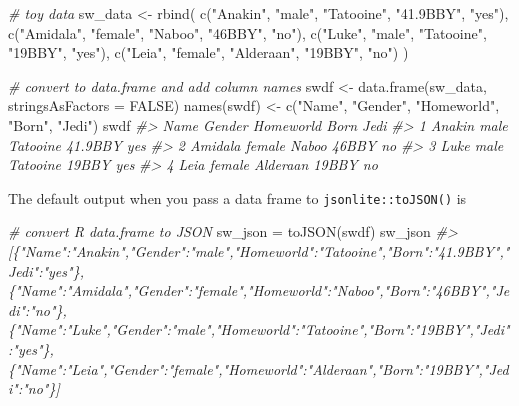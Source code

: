 \documentclass[
]{book}
\newenvironment{Shaded}{\begin{snugshade}}{\end{snugshade}}
\newcommand{\AttributeTok}[1]{\textcolor[rgb]{0.77,0.63,0.00}{#1}}
\newcommand{\CommentTok}[1]{\textcolor[rgb]{0.56,0.35,0.01}{\textit{#1}}}
\newcommand{\ConstantTok}[1]{\textcolor[rgb]{0.00,0.00,0.00}{#1}}
\newcommand{\FunctionTok}[1]{\textcolor[rgb]{0.00,0.00,0.00}{#1}}
\newcommand{\NormalTok}[1]{#1}
\newcommand{\OtherTok}[1]{\textcolor[rgb]{0.56,0.35,0.01}{#1}}
\newcommand{\StringTok}[1]{\textcolor[rgb]{0.31,0.60,0.02}{#1}}
\begin{document}
\begin{Shaded}
\begin{Highlighting}[]
\CommentTok{\# toy data}
\NormalTok{sw\_data }\OtherTok{\textless{}{-}} \FunctionTok{rbind}\NormalTok{(}
  \FunctionTok{c}\NormalTok{(}\StringTok{"Anakin"}\NormalTok{, }\StringTok{"male"}\NormalTok{, }\StringTok{"Tatooine"}\NormalTok{, }\StringTok{"41.9BBY"}\NormalTok{,  }\StringTok{"yes"}\NormalTok{),  }
  \FunctionTok{c}\NormalTok{(}\StringTok{"Amidala"}\NormalTok{, }\StringTok{"female"}\NormalTok{, }\StringTok{"Naboo"}\NormalTok{, }\StringTok{"46BBY"}\NormalTok{, }\StringTok{"no"}\NormalTok{),}
  \FunctionTok{c}\NormalTok{(}\StringTok{"Luke"}\NormalTok{, }\StringTok{"male"}\NormalTok{, }\StringTok{"Tatooine"}\NormalTok{, }\StringTok{"19BBY"}\NormalTok{, }\StringTok{"yes"}\NormalTok{),}
  \FunctionTok{c}\NormalTok{(}\StringTok{"Leia"}\NormalTok{, }\StringTok{"female"}\NormalTok{, }\StringTok{"Alderaan"}\NormalTok{, }\StringTok{"19BBY"}\NormalTok{, }\StringTok{"no"}\NormalTok{)}
\NormalTok{)}

\CommentTok{\# convert to data.frame and add column names}
\NormalTok{swdf }\OtherTok{\textless{}{-}} \FunctionTok{data.frame}\NormalTok{(sw\_data, }\AttributeTok{stringsAsFactors =} \ConstantTok{FALSE}\NormalTok{)}
\FunctionTok{names}\NormalTok{(swdf) }\OtherTok{\textless{}{-}} \FunctionTok{c}\NormalTok{(}\StringTok{"Name"}\NormalTok{, }\StringTok{"Gender"}\NormalTok{, }\StringTok{"Homeworld"}\NormalTok{, }\StringTok{"Born"}\NormalTok{, }\StringTok{"Jedi"}\NormalTok{)}
\NormalTok{swdf}
\CommentTok{\#\textgreater{}      Name Gender Homeworld    Born Jedi}
\CommentTok{\#\textgreater{} 1  Anakin   male  Tatooine 41.9BBY  yes}
\CommentTok{\#\textgreater{} 2 Amidala female     Naboo   46BBY   no}
\CommentTok{\#\textgreater{} 3    Luke   male  Tatooine   19BBY  yes}
\CommentTok{\#\textgreater{} 4    Leia female  Alderaan   19BBY   no}
\end{Highlighting}
\end{Shaded}

The default output when you pass a data frame to \texttt{jsonlite::toJSON()} is

\begin{Shaded}
\begin{Highlighting}[]
\CommentTok{\# convert R data.frame to JSON}
\NormalTok{sw\_json }\OtherTok{=} \FunctionTok{toJSON}\NormalTok{(swdf)}
\NormalTok{sw\_json}
\CommentTok{\#\textgreater{} [\{"Name":"Anakin","Gender":"male","Homeworld":"Tatooine","Born":"41.9BBY","Jedi":"yes"\},\{"Name":"Amidala","Gender":"female","Homeworld":"Naboo","Born":"46BBY","Jedi":"no"\},\{"Name":"Luke","Gender":"male","Homeworld":"Tatooine","Born":"19BBY","Jedi":"yes"\},\{"Name":"Leia","Gender":"female","Homeworld":"Alderaan","Born":"19BBY","Jedi":"no"\}]}
\end{Highlighting}
\end{Shaded}
\end{document}
